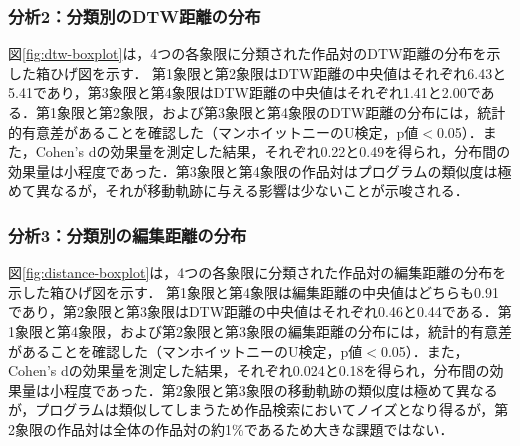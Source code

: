 \documentclass[T,J]{fose} %
\newcommand{\todo}[1]{\colorbox{yellow}{{\bf TODO}:}{\color{red} {\textbf{[#1]}}}}
\begin{document}
\subsubsection{分析2：分類別のDTW距離の分布}

図\ref{fig:dtw-boxplot}は，4つの各象限に分類された作品対のDTW距離の分布を示した箱ひげ図を示す．
第1象限と第2象限はDTW距離の中央値はそれぞれ6.43と5.41であり，第3象限と第4象限はDTW距離の中央値はそれぞれ1.41と2.00である．第1象限と第2象限，および第3象限と第4象限のDTW距離の分布には，統計的有意差があることを確認した（マンホイットニーのU検定，p値$<$0.05）．また，Cohen's d\cite{cohen2013statistical}の効果量を測定した結果，それぞれ0.22と0.49を得られ，分布間の効果量は小程度であった．第3象限と第4象限の作品対はプログラムの類似度は極めて異なるが，それが移動軌跡に与える影響は少ないことが示唆される．



\subsubsection{分析3：分類別の編集距離の分布}
図\ref{fig:distance-boxplot}は，4つの各象限に分類された作品対の編集距離の分布を示した箱ひげ図を示す．
第1象限と第4象限は編集距離の中央値はどちらも0.91であり，第2象限と第3象限はDTW距離の中央値はそれぞれ0.46と0.44である．第1象限と第4象限，および第2象限と第3象限の編集距離の分布には，統計的有意差があることを確認した（マンホイットニーのU検定，p値$<$0.05）．また，Cohen's d\cite{cohen2013statistical}の効果量を測定した結果，それぞれ0.024と0.18を得られ，分布間の効果量は小程度であった．第2象限と第3象限の移動軌跡の類似度は極めて異なるが，プログラムは類似してしまうため作品検索においてノイズとなり得るが，第2象限の作品対は全体の作品対の約1\%であるため大きな課題ではない．



\end{document}
